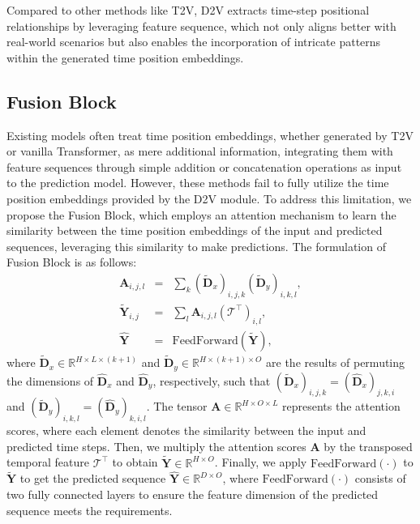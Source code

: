 \documentclass{article}
\begin{document}
Compared to other methods like T2V\cite{time2vec}, D2V extracts time-step positional relationships by leveraging feature sequence, which not only aligns better with real-world scenarios but also enables the incorporation of intricate patterns within the generated time position embeddings.

\subsection{Fusion Block} \label{Fusion_Block}


Existing models often treat time position embeddings, whether generated by T2V\cite{t2v_position_1,t2v_position_2,t2v_position_3,t2v_position_4} or vanilla Transformer\cite{transformer,fedformer,autoformer}, as mere additional information, integrating them with feature sequences through simple addition or concatenation operations as input to the prediction model.
However, these methods fail to fully utilize the time position embeddings provided by the D2V module. To address this limitation, we propose the Fusion Block, which employs an attention mechanism to learn the similarity between the time position embeddings of the input and predicted sequences, leveraging this similarity to make predictions. The formulation of Fusion Block is as follows:
\begin{eqnarray}
    \pmb{A}_{i,j,l} &= &\sum_k\left(\tilde{\pmb{D}}_{x}\right)_{i,j,k} \left(\tilde{\pmb{D}}_{y}\right)_{i,k,l},\\
    \widetilde{\pmb{Y}}_{i,j} &=&\sum_l \pmb{A}_{i,j,l} \left(\boldsymbol{\mathcal{T}}^{\top}\right)_{i,l} , \\
    \hat{\pmb{Y}} &=& \text{FeedForward}(\widetilde{\pmb{Y}}),
\end{eqnarray}
where $\tilde{\pmb{D}}_{x} \in \mathbb{R}^{H \times L \times (k+1)}$ and $\tilde{\pmb{D}}_{y} \in \mathbb{R}^{H \times (k+1) \times O}$ are the results of permuting the dimensions of $\hat{\pmb{D}}_{x}$ and $\hat{\pmb{D}}_{y}$, respectively, such that $\left(\tilde{\pmb{D}}_{x}\right)_{i,j,k}=\left(\hat{\pmb{D}}_{x}\right)_{j,k,i}$ and $\left(\tilde{\pmb{D}}_{y}\right)_{i,k,l}=\left(\hat{\pmb{D}}_{y}\right)_{k,i,l}$.
The tensor $\pmb{A} \in \mathbb{R}^{H \times O \times L }$ represents the attention scores, where each element denotes the similarity between the input and predicted time steps. 
Then, we multiply the attention scores $\pmb{A}$ by the transposed temporal feature $\boldsymbol{\mathcal{T}^\top}$ to obtain $\widetilde{\pmb{Y}} \in \mathbb{R}^{H \times O}$. 
Finally, we apply $\text{FeedForward}(\cdot)$ to $\widetilde{\pmb{Y}}$ to get the predicted sequence $\hat{\pmb{Y}} \in \mathbb{R}^{D \times O}$, where $\text{FeedForward}(\cdot)$ consists of two fully connected layers to ensure the feature dimension of the predicted sequence meets the requirements.
\end{document}
